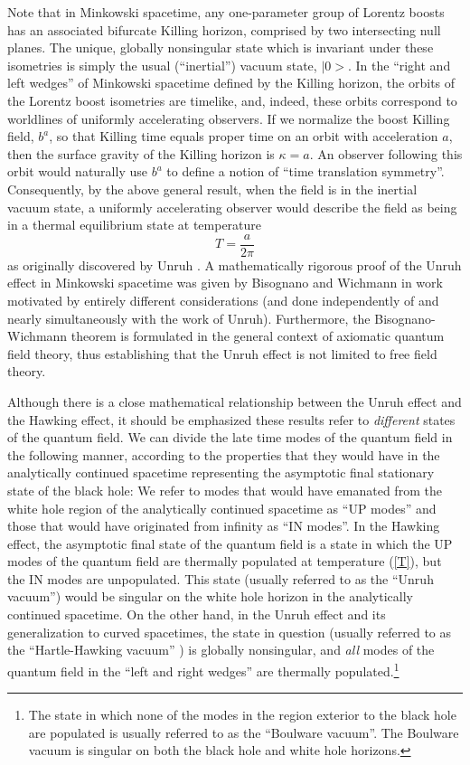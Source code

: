 \documentclass[12pt]{article}
\begin{document}
Note that in Minkowski spacetime, any one-parameter group of Lorentz
boosts has an associated bifurcate Killing horizon, comprised by two
intersecting null planes. The unique, globally nonsingular state which
is invariant under these isometries is simply the usual (``inertial'')
vacuum state, $|0>$.  In the ``right and left wedges'' of Minkowski
spacetime defined by the Killing horizon, the orbits of the Lorentz
boost isometries are timelike, and, indeed, these orbits correspond to
worldlines of uniformly accelerating observers. If we normalize the
boost Killing field, $b^a$, so that Killing time equals proper time on
an orbit with acceleration $a$, then the surface gravity of the
Killing horizon is $\kappa = a$. An observer following this orbit
would naturally use $b^a$ to define a notion of ``time translation
symmetry''. Consequently, by the above general result, when the field
is in the inertial vacuum state, a uniformly accelerating observer
would describe the field as being in a thermal equilibrium state at
temperature
\begin{equation}
T = \frac{a}{2 \pi} 
\label{Tu}
\end{equation}
as originally discovered by Unruh \cite{u1}. A mathematically rigorous
proof of the Unruh effect in Minkowski spacetime was given by
Bisognano and Wichmann \cite{bw} in work motivated by entirely
different considerations (and done independently of and nearly
simultaneously with the work of Unruh). Furthermore, the
Bisognano-Wichmann theorem is formulated in the general context of
axiomatic quantum field theory, thus establishing that the Unruh
effect is not limited to free field theory.

Although there is a close mathematical relationship between the Unruh
effect and the Hawking effect, it should be emphasized these results
refer to {\em different} states of the quantum field. We can divide
the late time modes of the quantum field in the following manner,
according to the properties that they would have in the analytically
continued spacetime \cite{rw2} representing the asymptotic final
stationary state of the black hole: We refer to modes that would have
emanated from the white hole region of the analytically continued
spacetime as ``UP modes'' and those that would have originated from
infinity as ``IN modes''.  In the Hawking effect, the asymptotic final
state of the quantum field is a state in which the UP modes of the
quantum field are thermally populated at temperature (\ref{T}), but
the IN modes are unpopulated. This state (usually referred to as the
``Unruh vacuum'') would be singular on the white hole horizon in the
analytically continued spacetime. On the other hand, in the Unruh
effect and its generalization to curved spacetimes, the state in
question (usually referred to as the ``Hartle-Hawking vacuum''
\cite{hh}) is globally nonsingular, and {\em all} modes of the quantum
field in the ``left and right wedges'' are thermally
populated.\footnote{The state in which none of the modes in the region
exterior to the black hole are populated is usually referred to as the
``Boulware vacuum''. The Boulware vacuum is singular on both the black
hole and white hole horizons.}
\end{document}
